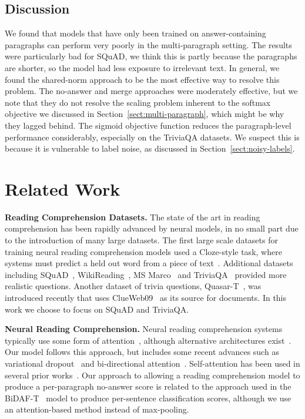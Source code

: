 \documentclass[11pt,a4paper]{article}
\begin{document}
\subsection{Discussion}
We found that models that have only been trained on answer-containing paragraphs can perform very poorly in the multi-paragraph setting. The results were particularly bad for SQuAD, we think this is partly because the paragraphs are shorter, so the model had less exposure to irrelevant text. In general, we found the shared-norm approach to be the most effective way to resolve this problem. 
The no-answer and merge approaches were moderately effective, but we note that they do not resolve the scaling problem inherent to the softmax objective we discussed in Section~\ref{sect:multi-paragraph}, which might be why they lagged behind. 
The sigmoid objective function reduces the paragraph-level performance considerably, especially on the TriviaQA datasets. We suspect this is because it is vulnerable to label noise, as discussed in Section~\ref{sect:noisy-labels}.

\section{Related Work}
\textbf{Reading Comprehension Datasets.} The state of the art in reading comprehension has been rapidly advanced by neural models, in no small part due to the introduction of many large datasets. The first large scale datasets for training neural reading comprehension models used a Cloze-style task, where systems must predict a held out word from a piece of text~\cite{hermann2015teaching, hill2015goldilocks}. Additional datasets including SQuAD~\cite{squad}, WikiReading~\cite{hewlett2016wikireading}, MS Marco~\cite{nguyen2016ms} and TriviaQA~\cite{triviaqa} provided more realistic questions. Another dataset of trivia questions, Quasar-T~\cite{dhingra2017quasar}, was introduced recently that uses ClueWeb09~\cite{callan2009clueweb09} as its source for documents. In this work we choose to focus on SQuAD and TriviaQA.

\textbf{Neural Reading Comprehension.} 
Neural reading comprehension systems typically use some form of attention~\citep{wang2016machine}, although alternative architectures exist~\cite{openqa, weissenborn2017fastqa}. Our model follows this approach, but includes some recent advances such as variational dropout~\cite{variational_dropout} and bi-directional attention~\cite{bidaf}. Self-attention has been used in several prior works~\cite{cheng2016long, wang2017gated, pan2017memen}. Our approach to allowing a reading comprehension model to produce a per-paragraph no-answer score is related to the approach used in the BiDAF-T~\cite{min2017question} model to produce per-sentence classification scores, although we use an attention-based method instead of max-pooling.
\end{document}
